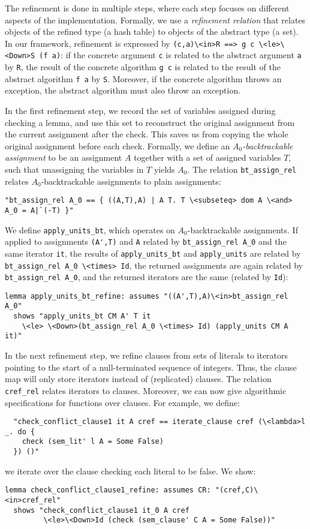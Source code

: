 \documentclass{llncs}
\newcommand{\isai}{\lstinline[language=isabelle,basicstyle=\normalsize\ttfamily\slshape]}
\begin{document}
The refinement is done in multiple steps, where each step focuses on different aspects of the implementation. 
Formally, we use a \emph{refinement relation} that relates objects of the refined type (\eg a hash table) to 
objects of the abstract type (\eg a set). In our framework, refinement is expressed 
by \isai{(c,a)\<in>R ==> g c \<le>\<Down>S (f a)}: if the concrete argument \isai$c$ is related to the abstract argument \isai$a$ by \isai$R$, the result of the concrete
algorithm \isai$g c$ is related to the result of the abstract algorithm \isai$f a$ by \isai$S$. Moreover, if the concrete algorithm throws an exception, 
the abstract algorithm must also throw an exception.

In the first refinement step, we record the set of variables assigned during checking a lemma, 
and use this set to reconstruct the original assignment from the current assignment after the check. 
This saves us from copying the whole original assignment before each check.
Formally, we define an \emph{$A_0$-backtrackable assignment} to be an assignment $A$ together with a set of assigned variables $T$, such that
unassigning the variables in $T$ yields $A_0$. The relation \isai{bt_assign_rel} relates $A_0$-backtrackable assignments to plain assignments:
\begin{lstlisting}
"bt_assign_rel A_0 == { ((A,T),A) | A T. T \<subseteq> dom A \<and> A_0 = A|`(-T) }"
\end{lstlisting}
We define \isai{apply_units_bt}, which operates on $A_0$-backtrackable assignments. If applied 
to assignments \isai$(A',T)$ and \isai$A$ related by \isai{bt_assign_rel A_0} and the same iterator \isai$it$, the results of 
\isai{apply_units_bt} and \isai{apply_units} are related by \isai{bt_assign_rel A_0 \<times> Id}, \ie the returned assignments 
are again related by \isai{bt_assign_rel A_0}, and the returned iterators are the same (related by \isai{Id}):
\begin{lstlisting}
lemma apply_units_bt_refine: assumes "((A',T),A)\<in>bt_assign_rel A_0"
  shows "apply_units_bt CM A' T it 
    \<le> \<Down>(bt_assign_rel A_0 \<times> Id) (apply_units CM A it)"
\end{lstlisting}

In the next refinement step, we refine clauses from sets of literals to iterators pointing to the start of a null-terminated sequence of integers.
Thus, the clause map will only store iterators instead of (replicated) clauses. The relation \isai{cref_rel} relates iterators to clauses.
Moreover, we can now give algorithmic specifications for functions over clauses. For example, we define:
\begin{lstlisting}
  "check_conflict_clause1 it A cref == iterate_clause cref (\<lambda>l _. do {
    check (sem_lit' l A = Some False)
  }) ()"
\end{lstlisting}
\ie we iterate over the clause checking each literal to be false. We show:
\begin{lstlisting}
lemma check_conflict_clause1_refine: assumes CR: "(cref,C)\<in>cref_rel"
  shows "check_conflict_clause1 it_0 A cref 
         \<le>\<Down>Id (check (sem_clause' C A = Some False))"
\end{lstlisting}
\end{document}
